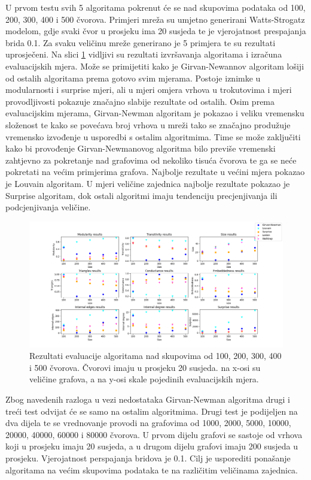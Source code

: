U prvom testu svih 5 algoritama pokrenut će se nad skupovima podataka od 100, 200, 300, 400 i 500 čvorova. Primjeri mreža su umjetno generirani Watts-Strogatz modelom, gdje svaki čvor u prosjeku ima 20 susjeda te je vjerojatnost prespajanja brida 0.1. Za svaku veličinu mreže generirano je 5 primjera te su rezultati uprosječeni. Na slici \ref{fig:test1} vidljivi su rezultati izvršavanja algoritama i izračuna evaluacijskih mjera. Može se primijetiti kako je Girvan-Newannov algoritam lošiji od ostalih algoritama prema gotovo svim mjerama. Postoje iznimke u modularnosti i surprise mjeri, ali u mjeri omjera vrhova u trokutovima i  mjeri provodljivosti pokazuje značajno slabije rezultate od ostalih. Osim prema evaluacijskim mjerama, Girvan-Newman algoritam je pokazao i veliku vremensku složenost te kako se povećava broj vrhova u mreži tako se značajno produžuje vremensko izvođenje u usporedbi s ostalim algoritmima. Time se može zaključiti kako bi provođenje Girvan-Newmanovog algoritma bilo previše vremenski zahtjevno za pokretanje nad grafovima od nekoliko tisuća čvorova te ga se neće pokretati na većim primjerima grafova. Najbolje rezultate u većini mjera pokazao je Louvain algoritam. U mjeri veličine zajednica najbolje rezultate pokazao je Surprise algoritam, dok ostali algoritmi imaju tendenciju precjenjivanja ili podcjenjivanja veličine.

\begin{figure}[b]
	\includegraphics[width=\linewidth]{images/test1.png}
	\caption{Rezultati evaluacije algoritama nad skupovima od 100, 200, 300, 400 i 500 čvorova. Čvorovi imaju u prosjeku 20 susjeda. na x-osi su veličine grafova, a na y-osi skale pojedinih evaluacijskih mjera.}
	\label{fig:test1}
\end{figure}


Zbog navedenih razloga u vezi nedostataka Girvan-Newman algoritma drugi i treći test odvijat će se samo na ostalim algoritmima. Drugi test je podijeljen na dva dijela te se vrednovanje provodi na grafovima od 1000, 2000, 5000, 10000, 20000, 40000, 60000 i 80000 čvorova. U prvom dijelu grafovi se sastoje od vrhova koji u prosjeku imaju 20 susjeda, a u drugom dijelu grafovi imaju 200 susjeda u prosjeku.  Vjerojatnost perspajanja bridova je 0.1. Cilj je usporediti ponašanje algoritama na većim skupovima podataka te na različitim veličinama zajednica.



